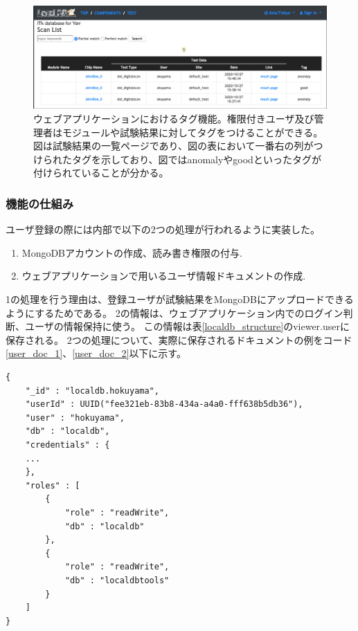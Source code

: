 \begin{figure}[bpt]\centering
\includegraphics[width=12cm]{./viewer_tag.png}
\caption[ウェブアプリケーションにおけるタグ機能]{ウェブアプリケーションにおけるタグ機能。権限付きユーザ及び管理者はモジュールや試験結果に対してタグをつけることができる。図は試験結果の一覧ページであり、図の表において一番右の列がつけられたタグを示しており、図ではanomalyやgoodといったタグが付けられていることが分かる。}
\label{webapp_tag}
\end{figure}

\clearpage

\subsubsection{機能の仕組み}
ユーザ登録の際には内部で以下の2つの処理が行われるように実装した。

\begin{enumerate}
  \item MongoDBアカウントの作成、読み書き権限の付与.
  \item ウェブアプリケーションで用いるユーザ情報ドキュメントの作成.
\end{enumerate}

1の処理を行う理由は、登録ユーザが試験結果をMongoDBにアップロードできるようにするためである。
2の情報は、ウェブアプリケーション内でのログイン判断、ユーザの情報保持に使う。
この情報は表\ref{localdb_structure}のviewer.userに保存される。
2つの処理について、実際に保存されるドキュメントの例をコード\ref{user_doc_1}、\ref{user_doc_2}以下に示す。

\begin{lstlisting}[basicstyle=\scriptsize,caption=MongoDBアカウント情報を持つドキュメントの例。リスト中の"roles"より、localdbとlocaldbtoolsの読み書き権限が付加されていることが分かる。,label=user_doc_1]
{
	"_id" : "localdb.hokuyama",
	"userId" : UUID("fee321eb-83b8-434a-a4a0-fff638b5db36"),
	"user" : "hokuyama",
	"db" : "localdb",
	"credentials" : {
    ...
	},
	"roles" : [
		{
			"role" : "readWrite",
			"db" : "localdb"
		},
		{
			"role" : "readWrite",
			"db" : "localdbtools"
		}
	]
}
\end{lstlisting}

